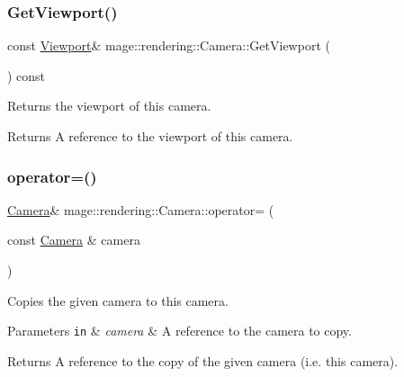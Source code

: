 \subsubsection{\texorpdfstring{Get\+Viewport()}{GetViewport()}\hspace{0.1cm}{\footnotesize\ttfamily [2/2]}}
{\footnotesize\ttfamily const \hyperlink{classmage_1_1rendering_1_1_viewport}{Viewport}\& mage\+::rendering\+::\+Camera\+::\+Get\+Viewport (\begin{DoxyParamCaption}{ }\end{DoxyParamCaption}) const\hspace{0.3cm}{\ttfamily [noexcept]}}

Returns the viewport of this camera.

\begin{DoxyReturn}{Returns}
A reference to the viewport of this camera. 
\end{DoxyReturn}
\hypertarget{classmage_1_1rendering_1_1_camera_a3aceb5277ca9ea66037de3d5ed44434a}{}\label{classmage_1_1rendering_1_1_camera_a3aceb5277ca9ea66037de3d5ed44434a} 
\subsubsection{\texorpdfstring{operator=()}{operator=()}\hspace{0.1cm}{\footnotesize\ttfamily [1/2]}}
{\footnotesize\ttfamily \hyperlink{classmage_1_1rendering_1_1_camera}{Camera}\& mage\+::rendering\+::\+Camera\+::operator= (\begin{DoxyParamCaption}\item[{const \hyperlink{classmage_1_1rendering_1_1_camera}{Camera} \&}]{camera }\end{DoxyParamCaption})\hspace{0.3cm}{\ttfamily [delete]}}

Copies the given camera to this camera.


\begin{DoxyParams}[1]{Parameters}
\mbox{\tt in}  & {\em camera} & A reference to the camera to copy. \\
\hline
\end{DoxyParams}
\begin{DoxyReturn}{Returns}
A reference to the copy of the given camera (i.\+e. this camera). 
\end{DoxyReturn}
\hypertarget{classmage_1_1rendering_1_1_camera_a61b594df300888d8d442855d18b871a3}{}\label{classmage_1_1rendering_1_1_camera_a61b594df300888d8d442855d18b871a3} 
